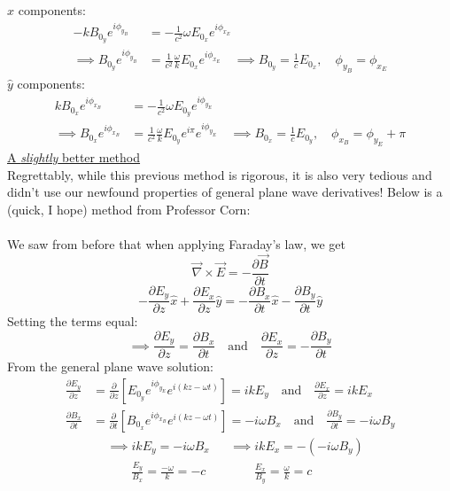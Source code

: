 \documentclass[12pt]{article}
\begin{document}
$\hat{x}$ components:
\[\begin{aligned}
-k B_{0_y} e^{i \phi_{y_B}} &= -\frac{1}{c^2} \omega E_{0_x} e^{i \phi_{x_E}} \\
\implies B_{0_y} e^{i \phi_{y_B}} &= \frac{1}{c^2} \frac{\omega}{k} E_{0_x} e^{i \phi_{x_E}} \quad \implies \boxed{B_{0_y} = \frac{1}{c} E_{0_x}, \quad \phi_{y_B} = \phi_{x_E}}
\end{aligned}\]
$\hat{y}$ components:
\[\begin{aligned}
k B_{0_x} e^{i \phi_{x_B}} &= -\frac{1}{c^2} \omega E_{0_y} e^{i \phi_{y_E}} \\
\implies B_{0_x} e^{i \phi_{x_B}} &= \frac{1}{c^2} \frac{\omega}{k} E_{0_y} e^{i \pi} e^{i \phi_{y_E}} \quad \implies \boxed{B_{0_x} = \frac{1}{c} E_{0_y}, \quad \phi_{x_B} = \phi_{y_E} + \pi}
\end{aligned}\]
\underline{A \textit{slightly} better method}\\
Regrettably, while this previous method is rigorous, it is also very tedious and didn't use our newfound properties of general plane wave derivatives! Below is a (quick, I hope) method from Professor Corn:\\\\
We saw from before that when applying Faraday's law, we get
\[\vec{\nabla}\times\vec{E} = -\frac{\partial \vec{B}}{\partial t}\]
\[-\frac{\partial E_y}{\partial z}\hat{x} + \frac{\partial E_x}{\partial z}\hat{y} = -\frac{\partial B_x}{\partial t}\hat{x} - \frac{\partial B_y}{\partial t}\hat{y}\]
Setting the terms equal:
\[\implies \frac{\partial E_y}{\partial z}= \frac{\partial B_x}{\partial t} \quad \text{and} \quad \frac{\partial E_x}{\partial z}= -\frac{\partial B_y}{\partial t}\]
From the general plane wave solution:
\[\begin{aligned}
\frac{\partial E_y}{\partial z} &= \frac{\partial}{\partial z} \left[ E_{0_y} e^{i \phi_{y_E}} e^{i(kz - \omega t)} \right] = i k E_y \quad \text{and} \quad \frac{\partial E_x}{\partial z} = i k E_x \\
\frac{\partial B_x}{\partial t} &= \frac{\partial}{\partial t} \left[ B_{0_x} e^{i \phi_{x_B}} e^{i(kz - \omega t)} \right] = -i \omega B_x \quad \text{and} \quad \frac{\partial B_y}{\partial t} = -i \omega B_y
\end{aligned}\]
\[\begin{aligned}
&\implies i k E_y = -i \omega B_x && \implies i k E_x = -(-i \omega B_y) \\
&\qquad \frac{E_y}{B_x} = \frac{-\omega}{k} = -c && \qquad \frac{E_x}{B_y} = \frac{\omega}{k} = c \\
\end{aligned}\]
\end{document}
